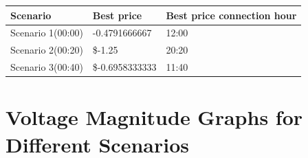 		
		\begin{tabular}{|l|l|l|}
			\hline
			Scenario          & Best price      & Best price connection hour \\ \hline
			Scenario 1(00:00) & -0.4791666667   & 12:00                      \\ \hline
			Scenario 2(00:20) & \$-1.25         & 20:20                      \\ \hline
			Scenario 3(00:40) & \$-0.6958333333 & 11:40                      \\ \hline
		\end{tabular}
	
	
	
	\section{Voltage Magnitude Graphs for Different Scenarios}
	
